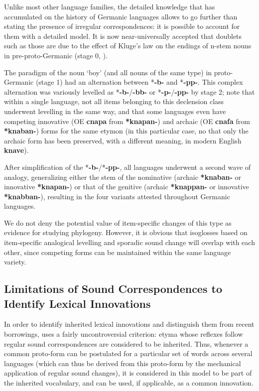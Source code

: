 \documentclass[svgnames,12pt]{scrartcl}
\newcommand{\ipa}[1]{\textbf{{\phon\mbox{#1}}}}
\begin{document}
{{Unlike most other language families, the detailed knowledge that has accumulated on the history of Germanic languages allows to go further than stating the presence of irregular correspondences: it is possible to account for them with a detailed model. It is now near-universally accepted that doublets such as those are due to the effect of Kluge's law on the endings of n-stem nouns in pre-proto-Germanic (stage 0, \citealt{kluge1884dehnung, kroonen11nstems}). 

The paradigm of the noun `boy' (and all nouns of the same type) in proto-Germanic  (stage 1) had an alternation between *\ipa{-b-} and *\ipa{-pp-}. This complex  alternation was variously levelled as *\ipa{-b-}/\ipa{-bb-} or *\ipa{-p-}/\ipa{-pp-} by stage 2; note that within a single language, not all items belonging to this declension class underwent levelling in the same way, and that some languages even have competing innovative (OE \ipa{cnapa}  from \ipa{*knapan-}) and archaic (OE \ipa{cnafa}  from \ipa{*knaban-}) forms for the same etymon (in this particular case, no that only the archaic form has been preserved, with a different meaning, in modern English \ipa{knave}).

After simplification of the *\ipa{-b-}/*\ipa{-pp-}, all languages underwent a second wave of analogy, generalizing either the stem of the nominative (archaic \ipa{*knaban-} or innovative \ipa{*knapan-}) or that of the genitive (archaic \ipa{*knappan-} or innovative \ipa{*knabban-}), resulting in the four variants attested throughout Germanic languages.

We do not deny the potential value of item-specific changes of this type as evidence for studying phylogeny. However, it is obvious that isoglosses based on item-specific analogical levelling and sporadic sound change will overlap with each other, since competing forms can be maintained within the same language variety.


\subsection{Limitations of Sound Correspondences to Identify Lexical Innovations}
In order to identify inherited lexical innovations and distinguish them from recent borrowings, \citet[176-8]{Francois2015} uses a fairly uncontroversial criterion: etyma whose reflexes follow regular sound correspondences are considered to be inherited. Thus, whenever a common proto-form can be postulated for a particular set of words across several languages (which can thus be derived from this proto-form by the mechanical application of regular sound changes), it is considered in this model to be part of the inherited vocabulary, and can be used, if applicable, as a common innovation.

}}
\end{document}
